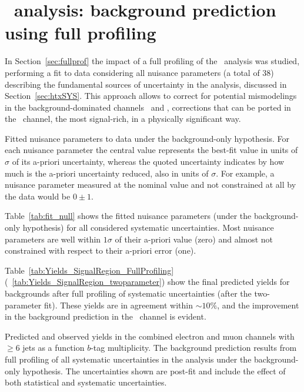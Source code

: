 \clearpage{\pagestyle{empty}\cleardoublepage}

\chapter{\htx\ analysis: background prediction using full profiling}
\label{app:fullprofiling}

In Section~\ref{sec:fullprof} the impact of a full
profiling of the \htx\ analysis was studied,
performing a fit to data considering all nuisance parameters 
(a total of 38) describing the fundamental
sources of uncertainty in the analysis, discussed
in Section~\ref{sec:htxSYS}. This approach allows 
to correct for potential mismodelings in the 
background-dominated channels \chii\ and \chiii,
corrections that can be ported in the \chiv\ channel,
the most signal-rich, in a physically significant way.
\begin{table}[htb]
\begin{center}
%
\footnotesize

\caption{\label{tab:fit_null}
Fitted nuisance parameters to data under the background-only hypothesis. 
For each nuisance parameter the central value represents the
best-fit value in units of $\sigma$ of its a-priori uncertainty, 
whereas the quoted uncertainty indicates by how much is the a-priori uncertainty
reduced, also in units of $\sigma$. For example, a nuisance parameter 
measured at the nominal value and not constrained at all by the data would
be $0\pm 1$.}
\end{center}
\end{table}
Table~\ref{tab:fit_null} shows the fitted nuisance 
parameters (under the background-only hypothesis) 
for all considered systematic uncertainties. 
Most nuisance parameters are well within
$1\sigma$ of their a-priori value (zero) and almost 
not constrained with respect to their a-priori error (one). 


Table~\ref{tab:Yields_SignalRegion_FullProfiling} 
(~\ref{tab:Yields_SignalRegion_twoparameter})
show the final predicted yields for backgrounds
after full profiling of systematic uncertainties
(after the two-parameter fit).
These yields are in agreement within $\sim 10\%$,
and the improvement in the background prediction
in the \chiv\ channel is evident.

\begin{table}[htbp]
\small
\begin{center}
\scriptsize

\caption{\label{tab:Yields_SignalRegion_FullProfiling} Predicted and observed yields in the combined electron and muon channels with $\geq 6$ jets 
as a function $b$-tag multiplicity. The background prediction results from full profiling of all systematic uncertainties in the analysis under the background-only hypothesis. The uncertainties shown are post-fit and include the effect of both statistical and systematic uncertainties.}
\end{center}
\end{table}

